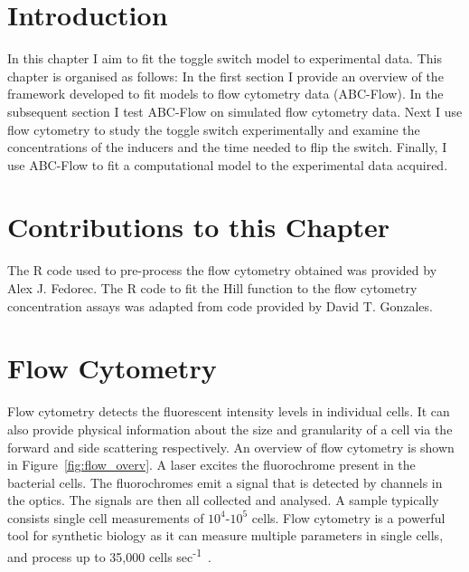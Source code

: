 \section{Introduction}

In this chapter I aim to fit the toggle switch model to experimental data. This chapter is organised as follows: In the first section I provide an overview of the framework developed to fit models to flow cytometry data (ABC-Flow). In the subsequent section I test ABC-Flow on simulated flow cytometry data. Next I use flow cytometry to study the toggle switch experimentally and examine the concentrations of the inducers and the time needed to flip the switch. Finally, I use ABC-Flow to fit a computational model to the experimental data acquired.


\section{Contributions to this Chapter}

The R code used to pre-process the flow cytometry obtained was provided by Alex J. Fedorec. The R code to fit the Hill function to the flow cytometry concentration assays was adapted from code provided by David T. Gonzales. 



\section{Flow Cytometry}
Flow cytometry detects the fluorescent intensity levels in individual cells. It can also provide physical information about the size and granularity of a cell via the forward and side scattering respectively. An overview of flow cytometry is shown in Figure~\ref{fig:flow_overv}. A laser excites the fluorochrome present in the bacterial cells. The fluorochromes emit a signal that is detected by channels in the optics. The signals are then all collected and analysed. A sample typically consists single cell measurements of $10^4$-$10^5$ cells. %
Flow cytometry is a powerful tool for synthetic biology as it can measure multiple parameters in single cells, and process up to 35,000 cells sec\textsuperscript{-1}~\autocite{Anonymous:2015tj}. 


